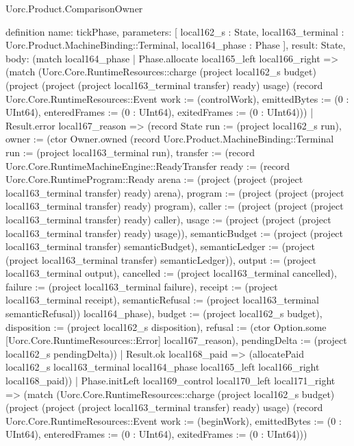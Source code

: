 \begin{lexlean}{Uorc.Product.ComparisonOwner}
\begin{semanticmodule}
definition{
  name: tickPhase,
  parameters: [
    local162_s : State,
    local163_terminal : Uorc.Product.MachineBinding::Terminal,
    local164_phase : Phase
  ],
  result: State,
  body: (match local164_phase
    | Phase.allocate local165_left local166_right => (match (Uorc.Core.RuntimeResources::charge (project local162_s budget) (project (project (project local163_terminal transfer) ready) usage) (record Uorc.Core.RuntimeResources::Event {work := (controlWork), emittedBytes := (0 : UInt64), enteredFrames := (0 : UInt64), exitedFrames := (0 : UInt64)}))
      | Result.error local167_reason => (record State {run := (project local162_s run), owner := (ctor Owner.owned (record Uorc.Product.MachineBinding::Terminal {run := (project local163_terminal run), transfer := (record Uorc.Core.RuntimeMachineEngine::ReadyTransfer {ready := (record Uorc.Core.RuntimeProgram::Ready {arena := (project (project (project local163_terminal transfer) ready) arena), program := (project (project (project local163_terminal transfer) ready) program), caller := (project (project (project local163_terminal transfer) ready) caller), usage := (project (project (project local163_terminal transfer) ready) usage)}), semanticBudget := (project (project local163_terminal transfer) semanticBudget), semanticLedger := (project (project local163_terminal transfer) semanticLedger)}), output := (project local163_terminal output), cancelled := (project local163_terminal cancelled), failure := (project local163_terminal failure), receipt := (project local163_terminal receipt), semanticRefusal := (project local163_terminal semanticRefusal)}) local164_phase), budget := (project local162_s budget), disposition := (project local162_s disposition), refusal := (ctor Option.some [Uorc.Core.RuntimeResources::Error] local167_reason), pendingDelta := (project local162_s pendingDelta)})
      | Result.ok local168_paid => (allocatePaid local162_s local163_terminal local164_phase local165_left local166_right local168_paid))
    | Phase.initLeft local169_control local170_left local171_right => (match (Uorc.Core.RuntimeResources::charge (project local162_s budget) (project (project (project local163_terminal transfer) ready) usage) (record Uorc.Core.RuntimeResources::Event {work := (beginWork), emittedBytes := (0 : UInt64), enteredFrames := (0 : UInt64), exitedFrames := (0 : UInt64)}))
}
\end{semanticmodule}
\end{lexlean}
